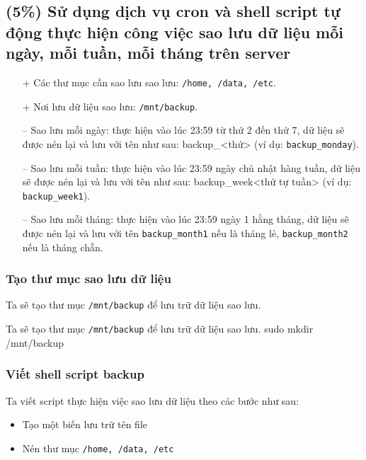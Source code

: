 \subsection{(5\%) Sử dụng dịch vụ cron và shell script tự động thực hiện công việc sao lưu
  dữ liệu mỗi ngày, mỗi tuần, mỗi tháng trên server}


\begin{itemize}
  \item[+] Các thư mục cần sao lưu sao lưu: \texttt{/home, /data, /etc}.
  \item[+] Nơi lưu dữ liệu sao lưu: \texttt{/mnt/backup}.
  \item[--] Sao lưu mỗi ngày: thực hiện vào lúc 23:59 từ thứ 2 đến thứ 7, dữ liệu sẽ được nén lại và lưu với tên như sau: backup\_<thứ> (ví dụ: \texttt{backup\_monday}).
  \item[--] Sao lưu mỗi tuần: thực hiện vào lúc 23:59 ngày chủ nhật hàng tuần, dữ liệu sẽ được nén lại và lưu với tên như sau: backup\_week<thứ tự tuần> (ví dụ: \texttt{backup\_week1}).
  \item[--] Sao lưu mỗi tháng: thực hiện vào lúc 23:59 ngày 1 hằng tháng, dữ liệu sẽ được nén lại và lưu với tên \texttt{backup\_month1} nếu là tháng lẻ, \texttt{backup\_month2} nếu là tháng chẵn.
\end{itemize}

\subsubsection{Tạo thư mục sao lưu dữ liệu}

Ta sẽ tạo thư mục \texttt{/mnt/backup} để lưu trữ dữ liệu sao lưu.

\begin{coding}{Ta sẽ tạo thư mục \texttt{/mnt/backup} để lưu trữ dữ liệu sao lưu.}
  sudo mkdir /mnt/backup
\end{coding}


\subsubsection{Viết shell script backup}

Ta viết script thực hiện việc sao lưu dữ liệu theo các bước như sau:
\begin{itemize}[label={--}]
  \item Tạo một biến lưu trữ tên file
  \item Nén thư mục \texttt{/home, /data, /etc}
\end{itemize}

